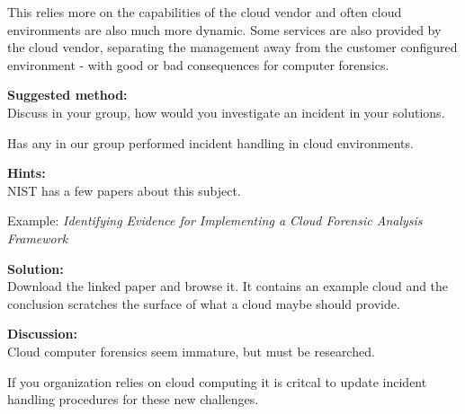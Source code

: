 \documentclass[a4paper,11pt,notitlepage]{report}
\begin{document}
This relies more on the capabilities of the cloud vendor and often cloud environments are also much more dynamic. Some services are also provided by the cloud vendor, separating the management away from the customer configured environment - with good or bad consequences for computer forensics.

{\bf Suggested method:}\\
Discuss in your group, how would you investigate an incident in your solutions.

Has any in our group performed incident handling in cloud environments.

{\bf Hints:}\\
NIST has a few papers about this subject.

Example:
\emph{Identifying Evidence for Implementing a Cloud Forensic Analysis Framework}

{\bf Solution:}\\
Download the linked paper and browse it. It contains an example cloud and the conclusion scratches the surface of what a cloud maybe should provide.

{\bf Discussion:}\\
Cloud computer forensics seem immature, but must be researched.

If you organization relies on cloud computing it is critcal to update incident handling procedures for these new challenges.
\end{document}
